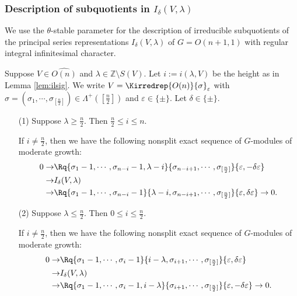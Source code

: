 \subsubsection{Description of subquotients 
 in $I_{\delta}(V,\lambda)$}
We use the $\theta$-stable parameter
 for the description
 of irreducible subquotients
 of the principal series representations 
 $I_{\delta}(V,\lambda)$
 of $G=O(n+1,1)$ with regular integral infinitesimal character.  
\begin{theorem}
\label{thm:IndV}
Suppose $V \in \widehat{O(n)}$ and $\lambda \in {\mathbb{Z}} \setminus S(V)$.  
Let $i := i(\lambda, V)$ be the height as in Lemma \ref{lem:ilsig}.  
We write $V=\Kirredrep{O(n)}{\sigma}_{\varepsilon}$
 with $\sigma =(\sigma_1, \cdots, \sigma_{[\frac n2]})\in \Lambda^+([\frac n 2])$ and $\varepsilon \in \{\pm\}$.  
Let $\delta \in \{\pm\}$.  
\begin{enumerate}
\item[{\rm{(1)}}]
Suppose $\lambda \ge \frac n 2$.  
Then $\frac n 2 \le i \le n$.  

If $i \ne \frac n 2$, 
then we have the following nonsplit exact sequence
 of $G$-modules of moderate growth:
\begin{align}
  0 \to& \Rq{\sigma_1-1, \cdots, \sigma_{n-i}-1, \lambda-i}{\sigma_{n-i+1}, \cdots, \sigma_{[\frac n 2]}}{\varepsilon , -\delta \varepsilon}
\notag
\\
\to& I_{\delta}(V, \lambda)
\notag
\\
\to& 
\Rq{\sigma_1-1, \cdots, \sigma_{n-i}-1}{\lambda-i, \sigma_{n-i+1}, \cdots, \sigma_{[\frac n 2]}}{\varepsilon , \delta \varepsilon}
\to 0.  
\label{eqn:161688new}
\end{align}




\item[{\rm{(2)}}]
Suppose $\lambda \le \frac n 2$.   
Then $0 \le i \le \frac n 2$.  

If $i \ne \frac n 2$, 
then we have the following nonsplit exact sequence
 of $G$-modules
 of moderate growth:
\begin{align}
  0 \to& \Rq{\sigma_1-1, \cdots, \sigma_i-1}{i-\lambda, \sigma_{i+1}, \cdots, \sigma_{[\frac n 2]}}{\varepsilon , \delta \varepsilon}
\notag
\\
\to& I_{\delta}(V, \lambda)
\notag
\\
\to&
\Rq{\sigma_1-1, \cdots, \sigma_i-1, i-\lambda}{\sigma_{i+1}, \cdots, \sigma_{[\frac n 2]}}{\varepsilon , -\delta \varepsilon}
\to 0.  
\label{eqn:161616new}
\end{align}


\end{enumerate}
\end{theorem}
